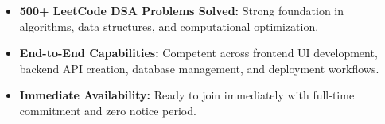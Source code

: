\documentclass[a4paper,10pt]{article}
\begin{document}
\begin{itemize}

    \item \textbf{500+ LeetCode DSA Problems Solved:} Strong foundation in algorithms, data structures, and computational optimization.

    \item \textbf{End-to-End Capabilities:} Competent across frontend UI development, backend API creation, database management, and deployment workflows.

    \item \textbf{Immediate Availability:} Ready to join immediately with full-time commitment and zero notice period.

\end{itemize}

\end{document}
